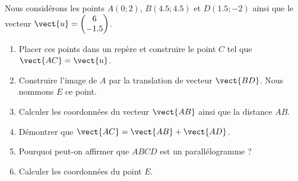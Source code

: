 
\begin{exercice}\label{exosmath-0661}

    Nous considérons les points \( A(0;2)\), \( B(4.5;4.5)\) et \( D(1.5;-2)\) ainsi que le vecteur \( \vect{ u }=\begin{pmatrix}
        6    \\ 
        -1.5    
    \end{pmatrix}\).
    \begin{enumerate}
        \item
            Placer ces points dans un repère et construire le point \( C\) tel que \( \vect{ AC }=\vect{ u }\).
        \item
            Construire l'image de \( A\) par la translation de vecteur \( \vect{ BD }\). Nous nommons \( E\) ce point.
        \item
            Calculer les coordonnées du vecteur \( \vect{ AB }\) ainsi que la distance \( AB\).
        \item
            Démontrer que \( \vect{ AC }=\vect{ AB }+\vect{ AD }\).
        \item
            Pourquoi peut-on affirmer que \( ABCD\) est un parallélogramme ?
        \item
            Calculer les coordonnées du point \( E\).
    \end{enumerate}

\end{exercice}
